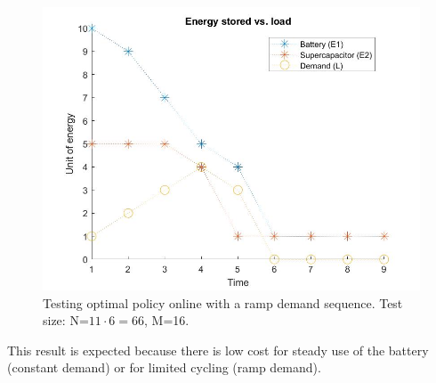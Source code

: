 \documentclass[conference]{IEEEtran}
\begin{document}
\begin{figure}[htbp]
\centerline{\includegraphics[scale=0.25]{EnergyStoredvsload_RampLoad(E1_max=10,E2_max=5).jpg}}
\caption{Testing optimal policy online with a ramp demand sequence. Test size: N=$11\cdot6=66$, M=16.}
\label{fig:RampDemand}
\end{figure} This result is expected because there is low cost for steady use of the battery (constant demand) or for limited cycling (ramp demand).
\end{document}
